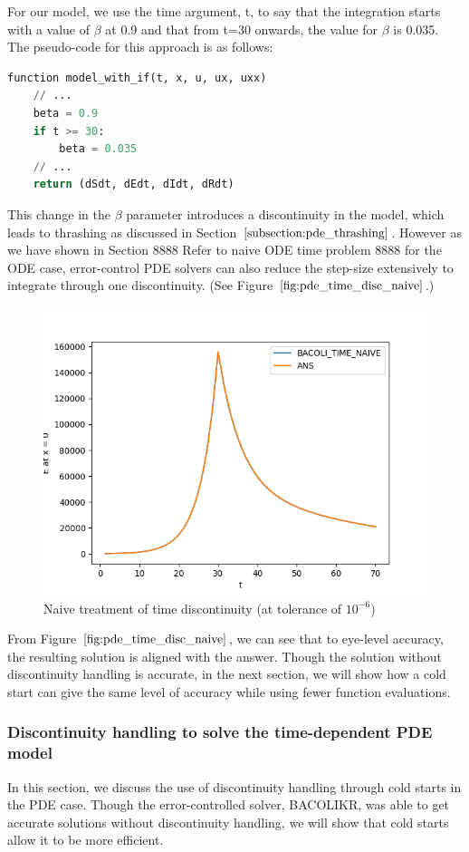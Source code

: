 \documentclass{article}
\begin{document}
For our model, we use the time argument, t, to say that the integration starts with a value of $\beta$ at 0.9 and that from t=30 onwards, the value for $\beta$ is 0.035. The pseudo-code for this approach is as follows:

\begin{minipage}{\linewidth}
\begin{lstlisting}[language=Python]
function model_with_if(t, x, u, ux, uxx)
	// ...
	beta = 0.9
	if t >= 30:
		beta = 0.035
	// ...
	return (dSdt, dEdt, dIdt, dRdt)

\end{lstlisting}
\end{minipage}

This change in the $\beta$ parameter introduces a discontinuity in the model, which leads to thrashing as discussed in Section $\ref{subsection:pde_thrashing}$. However as we have shown in Section 8888 Refer to naive ODE time problem 8888 for the ODE case, error-control PDE solvers can also reduce the step-size extensively to integrate through one discontinuity. (See Figure $\ref{fig:pde_time_disc_naive}$.)

\begin{figure}[H]
\centering
\includegraphics[width=0.7\linewidth]{./figures/pde_time_disc_naive}
\caption{Naive treatment of time discontinuity (at tolerance of $10^{-6}$)}
\label{fig:pde_time_disc_naive}
\end{figure}

From Figure $\ref{fig:pde_time_disc_naive}$, we can see that to eye-level accuracy, the resulting solution is aligned with the answer. Though the solution without discontinuity handling is accurate, in the next section, we will show how a cold start can give the same level of accuracy while using fewer function evaluations.

\subsubsection{Discontinuity handling to solve the time-dependent PDE model}
\label{subsubsection:pde_time_disc_hand}
In this section, we discuss the use of discontinuity handling through cold starts in the PDE case. Though the error-controlled solver, BACOLIKR, was able to get accurate solutions without discontinuity handling, we will show that cold starts allow it to be more efficient.
\end{document}
